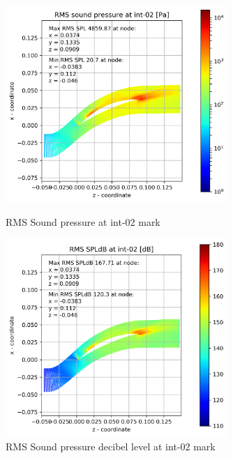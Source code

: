 \begin{figure}[ht]
  \centering
  \includegraphics[width=0.75\textwidth]{Figures/int-02-rms-spl.png}
  \caption{RMS Sound pressure at int-02 mark} \label{int-02-rms-spl}
  
  \vspace*{\floatsep}%

  \includegraphics[width=0.75\textwidth]{Figures/int-02-rms-spldb.png}
  \caption{RMS Sound pressure decibel level at int-02 mark} \label{int-02-rms-spldb}
\end{figure}
